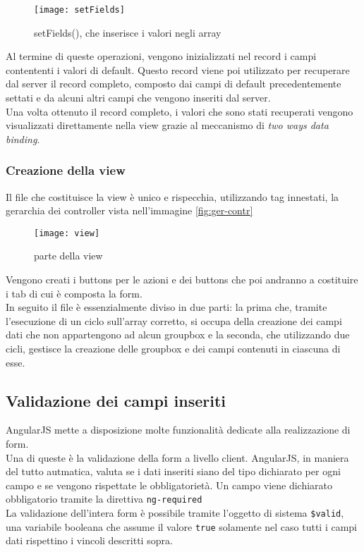 \begin{figure}[h]
	\centering
	\texttt{[image: setFields]}
	\caption{setFields(), che inserisce i valori negli array}
	\label{fig:set-fields}
\end{figure}
Al termine di queste operazioni, vengono inizializzati nel record i campi contententi i valori di default. Questo record viene poi utilizzato per recuperare dal server il record completo, composto dai campi di default precedentemente settati e da alcuni altri campi che vengono inseriti dal server.\\
Una volta ottenuto il record completo, i valori che sono stati recuperati vengono visualizzati direttamente nella view grazie al meccanismo di \emph{two ways data binding}.

\subsubsection{Creazione della view}
Il file che costituisce la view è unico e rispecchia, utilizzando tag innestati, la gerarchia dei controller vista nell'immagine \ref{fig:ger-contr}\\
\begin{figure}[h]
	\centering
	\texttt{[image: view]}
	\caption{parte della view}
	\label{fig:view}
\end{figure}
Vengono creati i buttons per le azioni e dei buttons che poi andranno a costituire i tab di cui è composta la form.\\
In seguito il file è essenzialmente diviso in due parti: la prima che, tramite l'esecuzione di un ciclo sull'array corretto, si occupa della creazione dei campi dati che non appartengono ad alcun groupbox e la seconda, che utilizzando due cicli, gestisce la creazione delle groupbox e dei campi contenuti in ciascuna di esse.
\subsection{Validazione dei campi inseriti}

AngularJS mette a disposizione molte funzionalità dedicate alla realizzazione di form.\\
Una di queste è la validazione della form a livello client. AngularJS, in maniera del tutto autmatica, valuta se i dati inseriti siano del tipo dichiarato per ogni campo e se vengono rispettate le obbligatorietà. Un campo viene dichiarato obbligatorio tramite la direttiva \lstinline[language=HTML]!ng-required! \\
La validazione dell'intera form è possibile tramite l'oggetto di sistema \lstinline[language=HTML]!$valid!, una variabile booleana che assume il valore \lstinline[language=HTML]!true! solamente nel caso tutti i campi dati rispettino i vincoli descritti sopra.

\newpage
